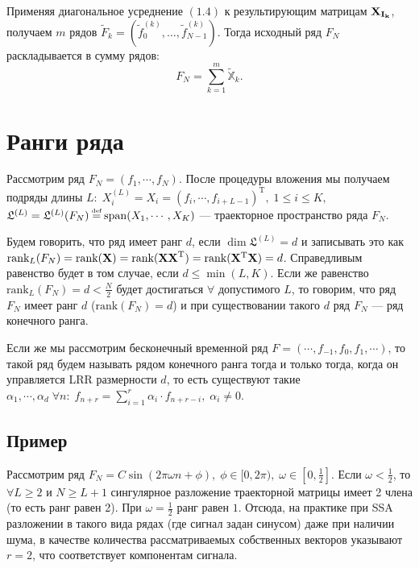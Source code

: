 \documentclass[specialist, substylefile = spbu.rtx,
			   subf, href, 12pt]{disser}
\newcommand\eqdef{\mathrel{\stackrel{\makebox[0pt]{\mbox{\normalfont\tiny def}}}{=}}}
\begin{document}
Применяя диагональное усреднение $(1.4)$ к результирующим матрицам $\bold{X_{I_k}}$, получаем $m$ рядов $\widetilde{F}_{k} = (\widetilde{f}_0^{(k)}, \dotsc, \widetilde{f}_{N-1}^{(k)})$. Тогда исходный ряд $F_N$ раскладывается в сумму рядов:
$$F_N = \sum\limits_{k=1}^{m}\widetilde{\mathbb{X}}_k.$$

\section{Ранги ряда}
Рассмотрим ряд $F_N = (f_1,\cdots,f_N)$. После процедуры вложения мы получаем подряды длины $L:\; X_i^{(L)} = X_i = (f_{i}, \cdots, f_{i+L-1})^\mathrm{T}, \; 1 \leq i \leq K,$ $\mathfrak{L}^{(L)} = \mathfrak{L}^{(L)}(F_N) \eqdef \mathrm{span}(X_1, \cdots, X_K)$ --- траекторное пространство ряда $F_N$.

Будем говорить, что ряд имеет ранг $d$, если $\dim\mathfrak{L}^{(L)} = d$ и записывать это как $\textrm{rank}_L(F_N) = \textrm{rank}(\bold{X}) = \textrm{rank}(\bold{XX}^\mathrm{T}) = \textrm{rank}(\bold{X}^\mathrm{T}\bold{X}) = d$. Справедливым равенство будет в том случае, если $d\leq\min(L, K)$. Если же равенство $\textrm{rank}_L(F_N) = d < \frac{N}{2}$ будет достигаться $\forall$ допустимого $L$, то говорим, что ряд $F_N$ имеет ранг $d$ ($\textrm{rank}(F_N) = d$) и при существовании такого $d$ ряд $F_N$ --- ряд конечного ранга.

Если же мы рассмотрим бесконечный временной ряд $F=(\cdots, f_{-1}, f_0, f_1, \cdots)$, то такой ряд будем называть рядом конечного ранга тогда и только тогда, когда он управляется LRR размерности $d$, то есть существуют такие $\alpha_1, \cdots, \alpha_d \; \forall n: \; f_{n+r} = \sum_{i=1}^{r} \alpha_i\cdot f_{n+r-i}, \; \alpha_i \neq 0$.

\subsection{Пример}

Рассмотрим ряд $F_N = C\sin(2\pi\omega n + \phi),\;\phi \in [0, 2\pi), \; \omega \in [0, \frac{1}{2}]$. Если $\omega < \frac{1}{2}$, то $\forall L\geq 2$ и $N\geq L+1$ сингулярное разложение траекторной матрицы имеет 2 члена (то есть ранг равен 2). При $\omega=\frac{1}{2}$ ранг равен $1$. Отсюда, на практике при SSA разложении в такого вида рядах (где сигнал задан синусом) даже при наличии шума, в качестве количества рассматриваемых собственных векторов указывают $r=2$, что соответствует компонентам сигнала.
\end{document}
